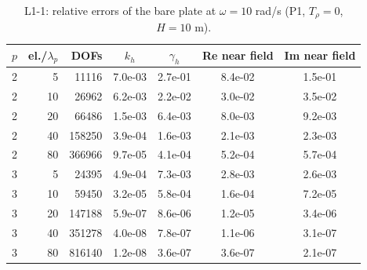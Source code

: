 \begin{table}[htbp]
\centering
\caption{L1-1: relative errors of the bare plate at $\omega = 10$ rad/s (P1, $T_\rho = 0$, $H = 10$ m).}
\label{tab:L1-1}
\begin{tabular}{rrrcccc}
\toprule
$p$ & el./$\lambda_p$ & DOFs & $k_h$ & $\gamma_h$ & Re near field & Im near field \\
\midrule
2 & 5 & 11116 & 7.0e-03 & 2.7e-01 & 8.4e-02 & 1.5e-01 \\
2 & 10 & 26962 & 6.2e-03 & 2.2e-02 & 3.0e-02 & 3.5e-02 \\
2 & 20 & 66486 & 1.5e-03 & 6.4e-03 & 8.0e-03 & 9.2e-03 \\
2 & 40 & 158250 & 3.9e-04 & 1.6e-03 & 2.1e-03 & 2.3e-03 \\
2 & 80 & 366966 & 9.7e-05 & 4.1e-04 & 5.2e-04 & 5.7e-04 \\
3 & 5 & 24395 & 4.9e-04 & 7.3e-03 & 2.8e-03 & 2.6e-03 \\
3 & 10 & 59450 & 3.2e-05 & 5.8e-04 & 1.6e-04 & 7.2e-05 \\
3 & 20 & 147188 & 5.9e-07 & 8.6e-06 & 1.2e-05 & 3.4e-06 \\
3 & 40 & 351278 & 4.0e-08 & 7.8e-07 & 1.1e-06 & 3.1e-07 \\
3 & 80 & 816140 & 1.2e-08 & 3.6e-07 & 3.6e-07 & 2.1e-07 \\
\bottomrule
\end{tabular}
\end{table}
